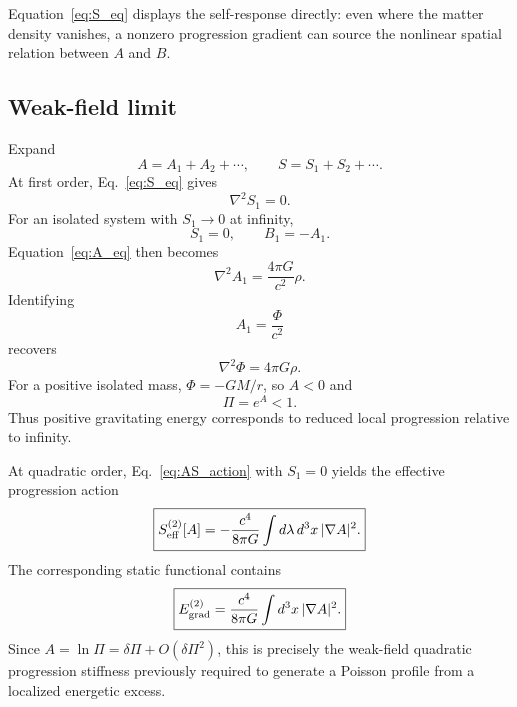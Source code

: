 \documentclass[11pt]{article}
\begin{document}
Equation~\eqref{eq:S_eq} displays the self-response directly: even where the matter density vanishes, a nonzero progression gradient can source the nonlinear spatial relation between $A$ and $B$.

\subsection{Weak-field limit}

Expand
\begin{equation}
    A=A_1+A_2+\cdots,
    \qquad
    S=S_1+S_2+\cdots.
\end{equation}
At first order, Eq.~\eqref{eq:S_eq} gives
\begin{equation}
    \nabla^2S_1=0.
\end{equation}
For an isolated system with $S_1\to0$ at infinity,
\begin{equation}
    \boxed{S_1=0,\qquad B_1=-A_1.}
    \label{eq:BminusA}
\end{equation}
Equation~\eqref{eq:A_eq} then becomes
\begin{equation}
    \boxed{
    \nabla^2A_1=\frac{4\pi G}{c^2}\rho.}
    \label{eq:PoissonA}
\end{equation}
Identifying
\begin{equation}
    A_1=\frac{\Phi}{c^2}
\end{equation}
recovers
\begin{equation}
    \nabla^2\Phi=4\pi G\rho.
\end{equation}
For a positive isolated mass, $\Phi=-GM/r$, so $A<0$ and
\begin{equation}
    \Pi=e^A<1.
\end{equation}
Thus positive gravitating energy corresponds to reduced local progression relative to infinity.

At quadratic order, Eq.~\eqref{eq:AS_action} with $S_1=0$ yields the effective progression action
\begin{equation}
    \boxed{
    S_{\rm eff}^{(2)}[A]
    =-\frac{c^4}{8\pi G}
    \int d\lambda\,d^3x\,|\nabla A|^2.}
    \label{eq:A_eff_action}
\end{equation}
The corresponding static functional contains
\begin{equation}
    \boxed{
    E_{\rm grad}^{(2)}
    =\frac{c^4}{8\pi G}\int d^3x\,|\nabla A|^2.}
    \label{eq:grad_energy}
\end{equation}
Since $A=\ln\Pi=\delta\Pi+O(\delta\Pi^2)$, this is precisely the weak-field quadratic progression stiffness previously required to generate a Poisson profile from a localized energetic excess.
\end{document}
